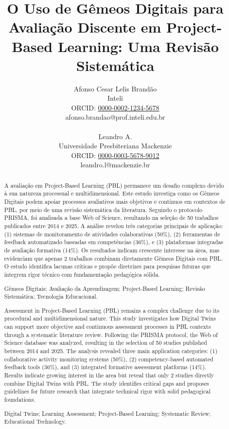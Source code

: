 \documentclass[english, spanish, brazilian]{RBIEarticle} %
\title{O Uso de Gêmeos Digitais para Avaliação Discente em Project-Based Learning: Uma Revisão Sistemática}
\author{%
\parbox{8cm}{%
Afonso Cesar Lelis Brandão\\
Inteli\\
ORCID: \href{https://orcid.org/0000-0002-1234-5678}{0000-0002-1234-5678}\\
afonso.brandao@prof.inteli.edu.br\\\\
Leandro A.\\
Universidade Presbiteriana Mackenzie\\
ORCID: \href{https://orcid.org/0000-0003-5678-9012}{0000-0003-5678-9012}\\
leandro.l@mackenzie.br}}
\begin{document}
\maketitle

\begin{otherlanguage}{brazilian}
\begin{abstract}
A avaliação em Project-Based Learning (PBL) permanece um desafio complexo devido à sua natureza processual e multidimensional. Este estudo investiga como os Gêmeos Digitais podem apoiar processos avaliativos mais objetivos e contínuos em contextos de PBL, por meio de uma revisão sistemática da literatura. Seguindo o protocolo PRISMA, foi analisada a base Web of Science, resultando na seleção de 50 trabalhos publicados entre 2014 e 2025. A análise revelou três categorias principais de aplicação: (1) sistemas de monitoramento de atividades colaborativas (50\%), (2) ferramentas de feedback automatizado baseadas em competências (36\%), e (3) plataformas integradas de avaliação formativa (14\%). Os resultados indicam crescente interesse na área, mas evidenciam que apenas 2 trabalhos combinam diretamente Gêmeos Digitais com PBL. O estudo identifica lacunas críticas e propõe diretrizes para pesquisas futuras que integrem rigor técnico com fundamentação pedagógica sólida.

\keywords Gêmeos Digitais; Avaliação da Aprendizagem; Project-Based Learning; Revisão Sistemática; Tecnologia Educacional.
\end{abstract}
\end{otherlanguage}

\begin{otherlanguage}{english}
\begin{abstract}
Assessment in Project-Based Learning (PBL) remains a complex challenge due to its procedural and multidimensional nature. This study investigates how Digital Twins can support more objective and continuous assessment processes in PBL contexts through a systematic literature review. Following the PRISMA protocol, the Web of Science database was analyzed, resulting in the selection of 50 studies published between 2014 and 2025. The analysis revealed three main application categories: (1) collaborative activity monitoring systems (50\%), (2) competency-based automated feedback tools (36\%), and (3) integrated formative assessment platforms (14\%). Results indicate growing interest in the area but reveal that only 2 studies directly combine Digital Twins with PBL. The study identifies critical gaps and proposes guidelines for future research that integrate technical rigor with solid pedagogical foundations.

\keywords Digital Twins; Learning Assessment; Project-Based Learning; Systematic Review; Educational Technology.
\end{abstract}
\end{otherlanguage}
\end{document}
